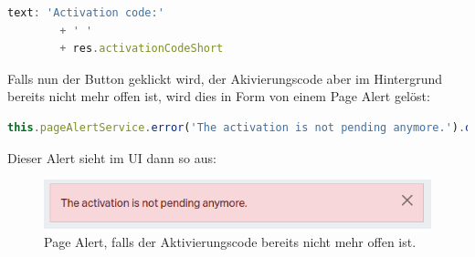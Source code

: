 \begin{lstlisting}[language=TypeScript]
text: 'Activation code:'
		+ ' '
		+ res.activationCodeShort

\end{lstlisting}
Falls nun der Button geklickt wird, der Akivierungscode aber im Hintergrund bereits nicht mehr offen ist, wird dies in Form von einem Page Alert gelöst:
\begin{lstlisting}[language=TypeScript]
this.pageAlertService.error('The activation is not pending anymore.').display();
\end{lstlisting}
Dieser Alert sieht im UI dann so aus:
\begin{figure}[H]
	\begin{center}
		\includegraphics[width=1.0\textwidth]{ressourcen/pagealert}
		\caption[Page Alert]{Page Alert, falls der Aktivierungscode bereits nicht mehr offen ist.}\label{fig:pagealert}
	\end{center}
\end{figure}

